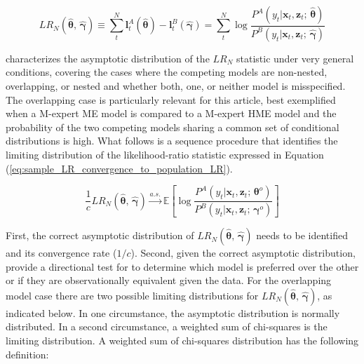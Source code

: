 \documentclass[12pt]{article}
\theoremstyle{definition}
\begin{document}
\begin{equation} \label{eq:LR_statistic}
  LR_{N} (\hat{\boldsymbol{\theta}}, \, \hat{\boldsymbol{\gamma}}) \equiv  \sum_{t}^{N} \boldsymbol{l}^{A}_{t}(\hat{\boldsymbol{\theta}}) - \boldsymbol{l}^{B}_{t}(\hat{\boldsymbol{\gamma}}) = \sum_{t}^{N} \log \frac{ P^{A}(y_{t} | \boldsymbol{x}_{t}, \boldsymbol{z}_{t}; \, \hat{\boldsymbol{\theta}}) }{ P^{B}(y_{t} | \boldsymbol{x}_{t}, \boldsymbol{z}_{t}; \, \hat{\boldsymbol{\gamma}}) }
\end{equation}

\citet{Voung1989} characterizes the asymptotic distribution of the $LR_{N}$ statistic under very general
conditions, covering the cases where the competing models are non-nested, overlapping,
or nested and whether both, one, or neither model is misspecified.
The overlapping case is particularly relevant for this article, best exemplified 
when a M-expert ME model is compared to a M-expert HME model and the probability
of the two competing models sharing a common set of conditional distributions
is high. What follows is a sequence procedure that identifies the limiting
distribution of the likelihood-ratio statistic expressed in Equation
(\ref{eq:sample_LR_convergence_to_population_LR}).

\begin{equation} \label{eq:sample_LR_convergence_to_population_LR}
  \frac{1}{c} LR_{N}(\hat{\boldsymbol{\theta}}, \, \hat{\boldsymbol{\gamma}}) \overset{a.s.}{\longrightarrow} \mathbb{E} \left[ \log \frac{P^{A}(y_{t} | \boldsymbol{x}_{t}, \boldsymbol{z}_{t}; \, \boldsymbol{\theta}^{o})}{P^{B}(y_{t} | \boldsymbol{x}_{t}, \boldsymbol{z}_{t}; \, \boldsymbol{\gamma}^{o})} \right]
\end{equation}

First, the correct asymptotic distribution of
$LR_{N}(\hat{\boldsymbol{\theta}}, \, \hat{\boldsymbol{\gamma}})$ needs to be 
identified and its convergence rate ($1/c$). Second, given the correct asymptotic
distribution, provide a directional test for to determine which model is preferred over
the other or if they are observationally equivalent given the data.
For the overlapping model case there are two possible limiting distributions
for $LR_{N}(\hat{\boldsymbol{\theta}}, \, \hat{\boldsymbol{\gamma}})$, as indicated
below. In one circumstance, the asymptotic distribution is normally distributed.
In a second circumstance, a weighted sum of chi-squares is the limiting distribution.
A weighted sum of chi-squares distribution has the following definition:
\end{document}
